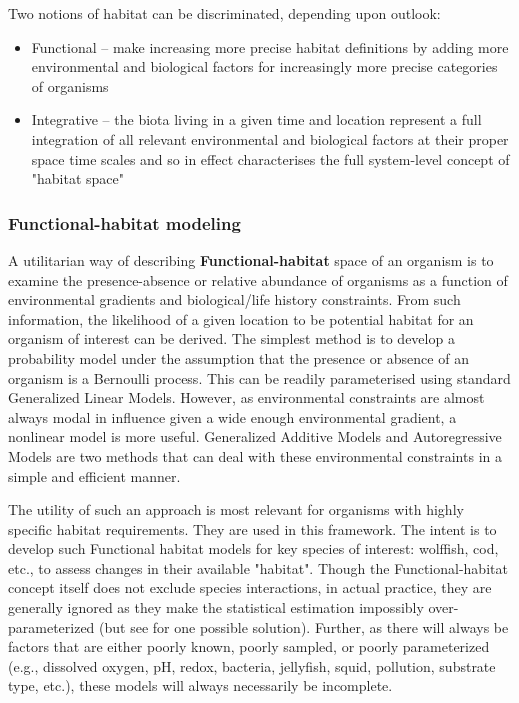 \documentclass[letterpaper,portrait,11pt]{scrartcl}
\numberwithin{equation}{section}		%
\numberwithin{figure}{section}		%
\numberwithin{table}{section}				%
\begin{document}
Two notions of habitat can be discriminated, depending upon outlook: 

\begin{itemize}
  \item Functional -- make increasing more precise habitat definitions by adding more environmental and biological factors for increasingly more precise categories of organisms   
  \item Integrative -- the biota living in a given time and location represent a full integration of all relevant environmental and biological factors at their proper space time scales and so in effect characterises the full system-level concept of "habitat space" 
\end{itemize}


\subsubsection{Functional-habitat modeling}
\label{sec:habitatSpecies}

A utilitarian way of describing \textbf{Functional-habitat} space of an organism is to examine the presence-absence or relative abundance of organisms as a function of environmental gradients and biological/life history constraints. From such information, the likelihood of a given location to be potential habitat for an organism of interest can be derived. The simplest method is to develop a probability model under the assumption that the presence or absence of an organism is a Bernoulli process. This can be readily parameterised using standard Generalized Linear Models. However, as environmental constraints are almost always modal in influence given a wide enough environmental gradient, a nonlinear model is more useful. Generalized Additive Models and Autoregressive Models are two methods that can deal with these environmental constraints in a simple and efficient manner. 

The utility of such an approach is most relevant for organisms with highly specific habitat requirements. They are used in this framework. The intent is to develop such Functional habitat models for key species of interest: wolffish, cod, etc., to assess changes in their available "habitat". Though the Functional-habitat concept itself does not exclude species interactions, in actual practice, they are generally ignored as they make the statistical estimation impossibly over-parameterized (but see \cite{choi:2012:resdoc} for one possible solution). Further, as there will always be factors that are either poorly known, poorly sampled, or poorly parameterized (e.g., dissolved oxygen, pH, redox, bacteria, jellyfish, squid, pollution, substrate type, etc.), these models will always necessarily be incomplete. 
\end{document}
